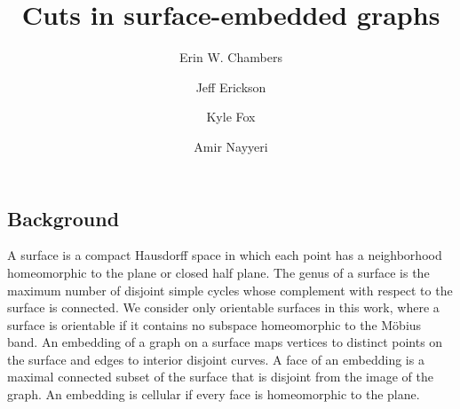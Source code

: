 \documentclass[natbib]{svcyclop}
\begin{document}
\title{Cuts in surface-embedded graphs}


\author{
	Erin W. Chambers
\and
	Jeff Erickson
\and
	Kyle Fox
\and
	Amir Nayyeri}







\maketitle


\ProbDef

\subsection{Background}


A surface is a compact Hausdorff space in which each point has a neighborhood homeomorphic to the plane or closed half plane.
The genus of a surface is the maximum number of disjoint simple cycles whose complement with respect to the surface is connected.
We consider only orientable surfaces in this work, where a surface is orientable if it contains no subspace homeomorphic to the M\"{o}bius band.
An embedding of a graph on a surface maps vertices to distinct points on the surface and edges to interior disjoint curves.  
A face of an embedding is a maximal connected subset of the surface that is disjoint from the image of the graph.
An embedding is cellular if every face is homeomorphic to the plane.
\end{document}

